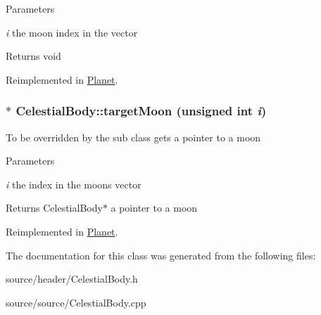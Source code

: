 \begin{DoxyParams}{Parameters}
\item[{\em i}]the moon index in the vector\end{DoxyParams}
\begin{DoxyReturn}{Returns}
void 
\end{DoxyReturn}


Reimplemented in \hyperlink{classPlanet_ad039e19380947fbf2695d78d4059f1db}{Planet}.

\hypertarget{classCelestialBody_a7919f1dba305a225978fa901a34daf25}{
\subsubsection[{targetMoon}]{ $\ast$ CelestialBody::targetMoon (unsigned int {\em i})}}
\label{d4/d0b/classCelestialBody_a7919f1dba305a225978fa901a34daf25}
To be overridden by the sub class gets a pointer to a moon


\begin{DoxyParams}{Parameters}
\item[{\em i}]the index in the moons vector\end{DoxyParams}
\begin{DoxyReturn}{Returns}
CelestialBody$\ast$ a pointer to a moon 
\end{DoxyReturn}


Reimplemented in \hyperlink{classPlanet_a86eb8c5701ace894c2ca47b80ae776e9}{Planet}.



The documentation for this class was generated from the following files:\begin{DoxyCompactItemize}
\item 
source/header/CelestialBody.h\item 
source/source/CelestialBody.cpp\end{DoxyCompactItemize}
